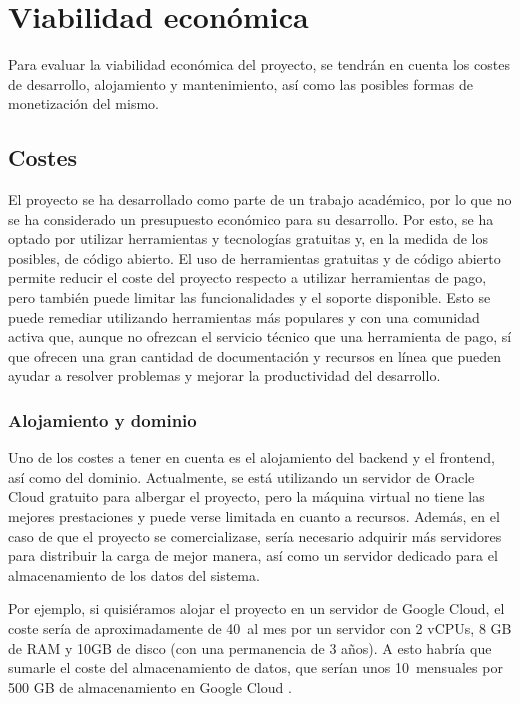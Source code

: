 \section{Viabilidad económica}
Para evaluar la viabilidad económica del proyecto, se tendrán en cuenta los
costes de desarrollo, alojamiento y mantenimiento, así como las posibles formas
de monetización del mismo.

\label{c08:sec:viabilidad-economica}
\subsection{Costes}
El proyecto se ha desarrollado como parte de un trabajo académico, por lo que no
se ha considerado un presupuesto económico para su desarrollo. Por esto, se ha
optado por utilizar herramientas y tecnologías gratuitas y, en la medida de los
posibles, de código abierto. El uso de herramientas gratuitas y de código
abierto permite reducir el coste del proyecto respecto a utilizar herramientas
de pago, pero también puede limitar las funcionalidades y el soporte disponible.
Esto se puede remediar utilizando herramientas más populares y con una comunidad
activa que, aunque no ofrezcan el servicio técnico que una herramienta de pago,
sí que ofrecen una gran cantidad de documentación y recursos en línea que pueden
ayudar a resolver problemas y mejorar la productividad del desarrollo.

\subsubsection{Alojamiento y dominio}
Uno de los costes a tener en cuenta es el alojamiento del \gls{backend} y el
\gls{frontend}, así como del dominio. Actualmente, se está utilizando un
servidor de Oracle Cloud gratuito para albergar el proyecto, pero la máquina
virtual no tiene las mejores prestaciones y puede verse limitada en cuanto a
recursos. Además, en el caso de que el proyecto se comercializase, sería
necesario adquirir más servidores para distribuir la carga de mejor manera, así
como un servidor dedicado para el almacenamiento de los datos del sistema.

Por ejemplo, si quisiéramos alojar el proyecto en un servidor de Google Cloud,
el coste sería de aproximadamente de 40\texteuro\ al mes por un servidor con 2
vCPUs, 8 GB de RAM y 10GB de disco (con una permanencia de 3 años). A esto
habría que sumarle el coste del almacenamiento de datos, que serían unos
10\texteuro\ mensuales por 500 GB de almacenamiento en Google Cloud
\parencite{googleCloudPricing}.

